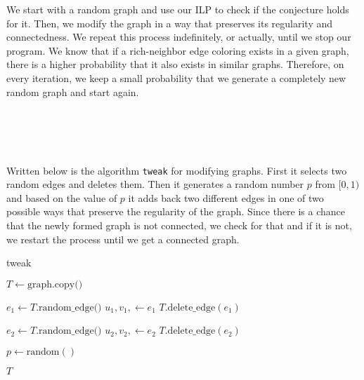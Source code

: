 \documentclass[12pt,a4paper]{amsart}
\theoremstyle{definition} %
\theoremstyle{plain} %
\begin{document}
    We start with a random graph and use our ILP to check if the conjecture holds for it. Then, we modify the graph in a way that preserves its regularity and connectedness. We repeat this process indefinitely, or actually, until we stop our program. We know that if a rich-neighbor edge coloring exists in a given graph, there is a higher probability that it also exists in similar graphs. Therefore, on every iteration, we keep a small probability that we generate a completely new random graph and start again.\\

    \textcolor{white}{i\\ i\\ i\\ i\\}
    \pagebreak

    Written below is the algorithm \texttt{tweak} for modifying graphs. First it selects two random edges and deletes them. Then it generates a random number $p$ from $[0, 1)$ and based on the value of $p$ it adds back two different edges in one of two possible ways that preserve the regularity of the graph. Since there is a chance that the newly formed graph is not connected, we check for that and if it is not, we restart the process until we get a connected graph.\\
    
    \begin{algorithm}[!htbp]
        \caption{tweak}\label{algo:tweakGraph}
        \LinesNumberedHidden
        \DontPrintSemicolon
        
        
        

            $T \gets \text{graph.copy()}$\;
            
            $e_1 \gets T.\text{random\_edge()}$\;
            $u_1, v_1, \gets e_1$\;
            $T.\text{delete\_edge}(e_1)$\;
            
            $e_2 \gets T.\text{random\_edge()}$\;
            $u_2, v_2,  \gets e_2$\;
            $T.\text{delete\_edge}(e_2)$\;
        
            $p \gets \text{random}()$\;
            
            
            \Return $T$\;
        \end{algorithm}
\end{document}
